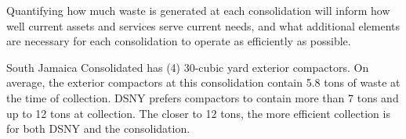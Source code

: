 
    Quantifying how much waste is generated at each consolidation will inform how well current assets and services serve current needs, and what additional elements are necessary for each consolidation to operate as efficiently as possible.
    
    South Jamaica Consolidated has (4) 30-cubic yard exterior compactors. On average, the exterior compactors at this consolidation contain 5.8 tons of waste at the time of collection. DSNY prefers compactors to contain more than 7 tons and up to 12 tons at collection. The closer to 12 tons, the more efficient collection is for both DSNY and the consolidation.
